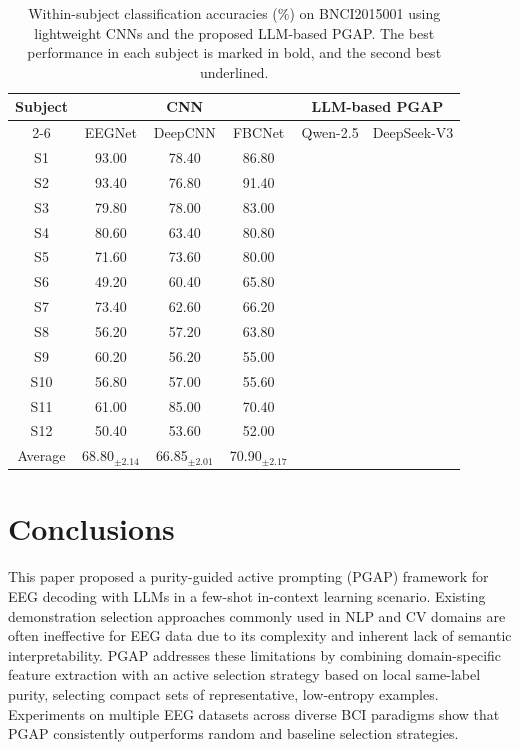 \documentclass[journal,twocolumn]{IEEEtran}
\begin{document}
\begin{table}[htpb] \centering
\setlength{\tabcolsep}{1mm}
\renewcommand\arraystretch{1}
\caption{Within-subject classification accuracies (\%) on BNCI2015001 using lightweight CNNs and the proposed LLM-based PGAP. The best performance in each subject is marked in bold, and the second best underlined.}
\label{tab:deepseek-result}
\begin{tabular}{c|ccc|cc}
\toprule
\multirow{2.5}{*}{Subject} & \multicolumn{3}{c|}{CNN} & \multicolumn{2}{c}{LLM-based PGAP} \\ \cmidrule(lr){2-6}
 & EEGNet & DeepCNN & FBCNet & Qwen-2.5 & DeepSeek-V3 \\
\midrule
S1 & 93.00  & 78.40  & 86.80 & & \\
S2 & 93.40  & 76.80  & 91.40 & & \\
S3 & 79.80  & 78.00  & 83.00 & & \\
S4 & 80.60  & 63.40  & 80.80 & & \\
S5 & 71.60  & 73.60  & 80.00 & & \\
S6 & 49.20  & 60.40  & 65.80 & & \\
S7 & 73.40  & 62.60  & 66.20 & & \\
S8 & 56.20  & 57.20  & 63.80 & & \\
S9 & 60.20  & 56.20  & 55.00 & & \\
S10 & 56.80  & 57.00  & 55.60 & & \\
S11 & 61.00  & 85.00  & 70.40 & & \\
S12 & 50.40  & 53.60  & 52.00 & & \\
\midrule
Average & 68.80$_{\pm2.14}$ & 66.85$_{\pm2.01}$ & 70.90$_{\pm2.17}$ & & \\
\bottomrule
\end{tabular}
\end{table}

\section{Conclusions}\label{sec:conclusion}
This paper proposed a purity-guided active prompting (PGAP) framework for EEG decoding with LLMs in a few-shot in-context learning scenario. Existing demonstration selection approaches commonly used in NLP and CV domains are often ineffective for EEG data due to its complexity and inherent lack of semantic interpretability. PGAP addresses these limitations by combining domain-specific feature extraction with an active selection strategy based on local same-label purity, selecting compact sets of representative, low-entropy examples. Experiments on multiple EEG datasets across diverse BCI paradigms show that PGAP consistently outperforms random and baseline selection strategies.


\end{document}
